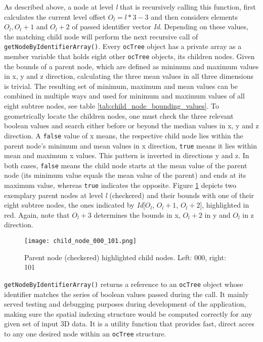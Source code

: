 As described above, a node at level \textit{l} that is recursively calling this function, first calculates the current level offset $O_l = l*3-3$ and then considers elements $O_l, O_l+1$ and $O_l+2$ of passed identifier vector \textit{Id}. Depending on these values, the matching child node will perform the next recursive call of \texttt{getNodeByIdentifierArray()}. Every \texttt{ocTree} object has a private array as a member variable that holds eight other \texttt{ocTree} objects, its children nodes. Given the bounds of a parent node, which are defined as minimum and maximum values in x, y and z direction, calculating the three mean values in all three dimensions is trivial. The resulting  set of minimum, maximum and mean values can be combined in multiple ways and used for minimum and maximum values of all eight subtree nodes, see table \ref{tab:child_node_bounding_values}. To geometrically locate the children nodes, one must check the three relevant boolean values and search either before or beyond the median values in x, y and z direction. A \texttt{false} value of x means, the respective child node lies within the parent node's minimum and mean values in x direction, \texttt{true} means it lies within mean and maximum x values. This pattern is inverted in directions y and z. In both cases, \texttt{false} means the child node starts at the mean value of the parent node (its minimum value equals the mean value of the parent) and ends at its maximum value, whereas \texttt{true} indicates the opposite. Figure \ref{fig:child_node_000_101.png} depicts two exemplary parent nodes at level \textit{l} (checkered) and their bounds with one of their eight subtree nodes, the ones indicated by \textit{Id}[$O_l$, $O_l+1$, $O_l+2$], highlighted in red. Again, note that \texttt{$O_l+3$} determines the bounds in x, \texttt{$O_l+2$} in y and \texttt{$O_l$} in z direction.

\begin{figure}[htb]
  \centering
  \texttt{[image: child\_node\_000\_101.png]}\\ %
  \caption{Parent node (checkered) highlighted child nodes. Left: 000, right: 101}\label{fig:child_node_000_101.png}
\end{figure}

	\texttt{getNodeByIdentifierArray()} returns a reference to an \texttt{ocTree} object whose identifier matches the series of boolean values passed during the call. It mainly served testing and debugging purposes during development of the application, making sure the spatial indexing structure would be computed correctly for any given set of input 3D data. It is a utility function that provides fast, direct acces to any one desired node within an \texttt{ocTree} structure.

